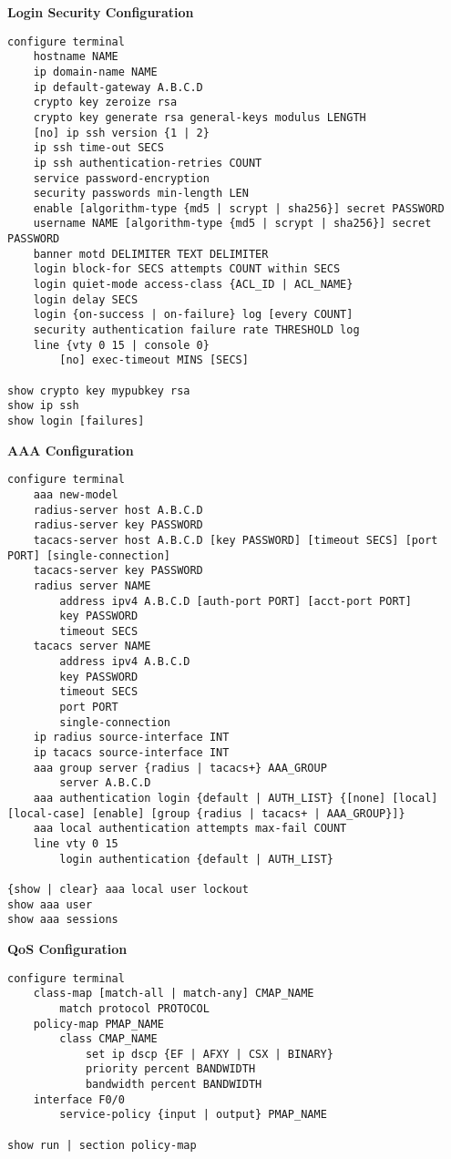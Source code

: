 \documentclass[12pt]{article}
\begin{document}
	\textbf{Login Security Configuration}
	\begin{lstlisting}
configure terminal
	hostname NAME
	ip domain-name NAME
	ip default-gateway A.B.C.D
	crypto key zeroize rsa
	crypto key generate rsa general-keys modulus LENGTH
	[no] ip ssh version {1 | 2}
	ip ssh time-out SECS
	ip ssh authentication-retries COUNT
	service password-encryption
	security passwords min-length LEN
	enable [algorithm-type {md5 | scrypt | sha256}] secret PASSWORD
	username NAME [algorithm-type {md5 | scrypt | sha256}] secret PASSWORD
	banner motd DELIMITER TEXT DELIMITER
	login block-for SECS attempts COUNT within SECS
	login quiet-mode access-class {ACL_ID | ACL_NAME}
	login delay SECS
	login {on-success | on-failure} log [every COUNT]
	security authentication failure rate THRESHOLD log
	line {vty 0 15 | console 0}
		[no] exec-timeout MINS [SECS]

show crypto key mypubkey rsa
show ip ssh
show login [failures]
	\end{lstlisting}

	\textbf{AAA Configuration}
	\begin{lstlisting}
configure terminal
	aaa new-model
	radius-server host A.B.C.D
	radius-server key PASSWORD
	tacacs-server host A.B.C.D [key PASSWORD] [timeout SECS] [port PORT] [single-connection]
	tacacs-server key PASSWORD
	radius server NAME
		address ipv4 A.B.C.D [auth-port PORT] [acct-port PORT]
		key PASSWORD
		timeout SECS
	tacacs server NAME
		address ipv4 A.B.C.D
		key PASSWORD
		timeout SECS
		port PORT
		single-connection
	ip radius source-interface INT
	ip tacacs source-interface INT
	aaa group server {radius | tacacs+} AAA_GROUP
		server A.B.C.D
	aaa authentication login {default | AUTH_LIST} {[none] [local] [local-case] [enable] [group {radius | tacacs+ | AAA_GROUP}]}
	aaa local authentication attempts max-fail COUNT
	line vty 0 15
		login authentication {default | AUTH_LIST}

{show | clear} aaa local user lockout
show aaa user
show aaa sessions
	\end{lstlisting}

	\textbf{QoS Configuration}
	\begin{lstlisting}
configure terminal
	class-map [match-all | match-any] CMAP_NAME
		match protocol PROTOCOL
	policy-map PMAP_NAME
		class CMAP_NAME
			set ip dscp {EF | AFXY | CSX | BINARY}
			priority percent BANDWIDTH
			bandwidth percent BANDWIDTH
	interface F0/0
		service-policy {input | output} PMAP_NAME

show run | section policy-map
	\end{lstlisting}
\end{document}
